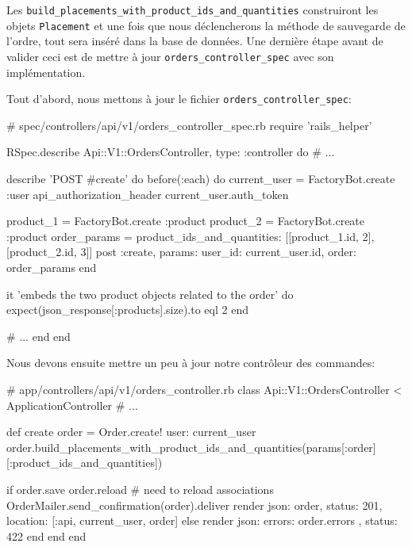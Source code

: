 \documentclass[]{report}
\begin{document}
    Les \verb|build_placements_with_product_ids_and_quantities| construiront les objets \verb|Placement| et une fois que nous déclencherons la méthode de sauvegarde de l'ordre, tout sera inséré dans la base de données. Une dernière étape avant de valider ceci est de mettre à jour \verb|orders_controller_spec| avec son implémentation.

    Tout d'abord, nous mettons à jour le fichier \verb|orders_controller_spec|:

    \begin{rubycode}
    # spec/controllers/api/v1/orders_controller_spec.rb
    require 'rails_helper'

    RSpec.describe Api::V1::OrdersController, type: :controller do
      # ...

      describe 'POST #create' do
        before(:each) do
          current_user = FactoryBot.create :user
          api_authorization_header current_user.auth_token

          product_1 = FactoryBot.create :product
          product_2 = FactoryBot.create :product
          order_params = {
            product_ids_and_quantities: [[product_1.id, 2], [product_2.id, 3]]
          }
          post :create, params: { user_id: current_user.id, order: order_params }
        end

        it 'embeds the two product objects related to the order' do
          expect(json_response[:products].size).to eql 2
        end

        # ...
      end
    end
    \end{rubycode}

    Nous devons ensuite mettre un peu à jour notre contrôleur des commandes:

    \begin{rubycode}
    # app/controllers/api/v1/orders_controller.rb
    class Api::V1::OrdersController < ApplicationController
      # ...

      def create
        order = Order.create! user: current_user
        order.build_placements_with_product_ids_and_quantities(params[:order][:product_ids_and_quantities])

        if order.save
          order.reload # need to reload associations
          OrderMailer.send_confirmation(order).deliver
          render json: order, status: 201, location: [:api, current_user, order]
        else
          render json: { errors: order.errors }, status: 422
        end
      end
    end
    \end{rubycode}
\end{document}

